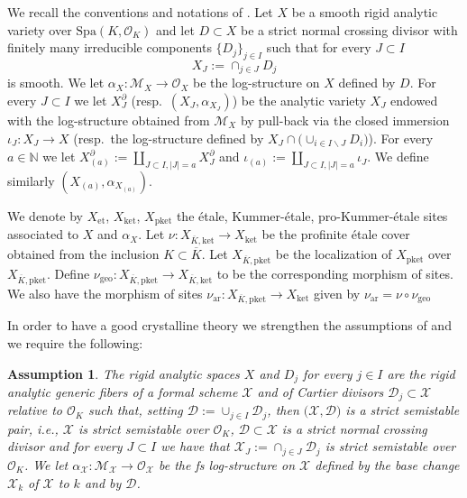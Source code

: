 \documentclass[asterisque,english]{smfart}
\newtheorem{assumption}[theo]{Assumption}
\begin{document}
We recall the conventions and notations of \cite[\S 2]{LLZ}.  Let $X$ be a smooth rigid analytic variety over $\mathrm{Spa}(K,\mathcal{O}_K)$ and let $D\subset X$ be a strict normal crossing divisor with finitely many irreducible components $\{D_j\}_{j\in I}$ such that for every $J\subset I$ $$X_J:=\cap_{j\in J} D_j$$ is smooth. We let $\alpha_X\colon \mathcal{M}_X\to \mathcal{O}_{X}$ be the log-structure on $X$ defined by $D$. For every $J\subset I$ we let $X_J^\partial$ (resp.~$(X_J,\alpha_{X_J})$) be the analytic variety $X_J$ endowed with the log-structure obtained from $\mathcal{M}_X$ by pull-back via the closed immersion $\iota_J\colon X_J\to X$ (resp.~the log-structure defined by $X_J\cap \bigl(\cup_{i\in I\backslash J} D_i\bigr)$).  For every $a\in \mathbb{N}$ we let $X_{(a)}^\partial:=\amalg_{J\subset I, \vert J\vert=a} X_J^\partial$ and $\iota_{(a)}:=\amalg_{J\subset I, \vert J\vert=a} \iota_J$. We define similarly $(X_{(a)},\alpha_{X_{(a)}})$.


We denote by $X_{\mathrm{et}}$, $X_{\mathrm{ket}}$, $X_{\mathrm{pket}}$ the \'etale, Kummer-\'etale, pro-Kummer-\'etale sites associated to $X$ and $\alpha_X$. Let $\nu\colon X_{\overline{K},\mathrm{ket}} \to X_{\mathrm{ket}}$ be the profinite \'etale cover obtained from the inclusion $K\subset \overline{K}$. Let  $X_{\overline{K},\mathrm{pket}}$ be the localization of $X_{\mathrm{pket}}$ over $X_{\overline{K},\mathrm{pket}}$. Define $\nu_{\mathrm{geo}}\colon X_{\overline{K},\mathrm{pket}} \to X_{\overline{K},\mathrm{ket}}$ to be the corresponding morphism of sites. We also have the morphism of sites $\nu_{\mathrm{ar}}\colon X_{\overline{K},\mathrm{pket}}\to X_{\mathrm{ket}}$ given by $\nu_{\mathrm{ar}}=\nu\circ \nu_{\mathrm{geo}}$




In order to have a good crystalline theory we  strengthen the assumptions of \cite{LLZ} and we require the following:

\begin{assumption}\label{ass:formalcase} The rigid analytic spaces $X$ and $D_j$ for every $j\in I$ are the rigid analytic generic fibers of a formal scheme $\mathcal{X}$ and of Cartier divisors  $\mathcal{D}_j\subset \mathcal{X}$ relative to $\mathcal{O}_K$ such that, setting $\mathcal{D}:=\cup_{j\in I} \mathcal{D}_j$, then  $\bigl(\mathcal{X},\mathcal{D}\bigr)$ is a strict semistable pair, i.e., $\mathcal{X}$ is strict semistable over $\mathcal{O}_K$, $\mathcal{D}\subset \mathcal{X}$ is a strict normal crossing divisor and  for every $J\subset I$ we have that $\mathcal{X}_J:=\cap_{j\in J} \mathcal{D}_j$ is strict semistable over $\mathcal{O}_K$.  We let $\alpha_{\mathcal{X}}\colon \mathcal{M}_\mathcal{X}\to \mathcal{O}_{\mathcal{X}}$ be the fs log-structure on $\mathcal{X}$ defined by the base change $\mathcal{X}_k$ of $\mathcal{X}$ to $k$ and by $\mathcal{D}$. 

\end{assumption}
\end{document}
